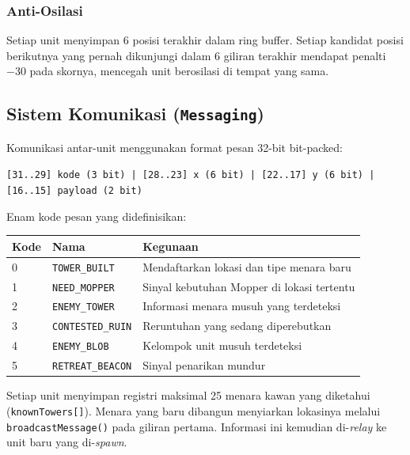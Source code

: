 \documentclass[12pt, a4paper]{article}
\begin{document}
\subsubsection*{Anti-Osilasi}

Setiap unit menyimpan 6 posisi terakhir dalam ring buffer. Setiap kandidat
posisi berikutnya yang pernah dikunjungi dalam 6 giliran terakhir mendapat penalti
$-30$ pada skornya, mencegah unit berosilasi di tempat yang sama.

\subsection{Sistem Komunikasi (\texttt{Messaging})}

Komunikasi antar-unit menggunakan format pesan 32-bit bit-packed:

\begin{center}
\texttt{[31..29] kode (3 bit) | [28..23] x (6 bit) | [22..17] y (6 bit) | [16..15] payload (2 bit)}
\end{center}

Enam kode pesan yang didefinisikan:

\begin{center}
\begin{tabular}{lll}
\toprule
\textbf{Kode} & \textbf{Nama} & \textbf{Kegunaan} \\
\midrule
0 & \texttt{TOWER\_BUILT}     & Mendaftarkan lokasi dan tipe menara baru \\
1 & \texttt{NEED\_MOPPER}     & Sinyal kebutuhan Mopper di lokasi tertentu \\
2 & \texttt{ENEMY\_TOWER}     & Informasi menara musuh yang terdeteksi \\
3 & \texttt{CONTESTED\_RUIN}  & Reruntuhan yang sedang diperebutkan \\
4 & \texttt{ENEMY\_BLOB}      & Kelompok unit musuh terdeteksi \\
5 & \texttt{RETREAT\_BEACON}  & Sinyal penarikan mundur \\
\bottomrule
\end{tabular}
\end{center}

Setiap unit menyimpan registri maksimal 25 menara kawan yang diketahui
(\texttt{knownTowers[]}). Menara yang baru dibangun menyiarkan lokasinya melalui
\texttt{broadcast\allowbreak Message()} pada giliran pertama. Informasi ini kemudian
di-\textit{relay} ke unit baru yang di-\textit{spawn}.

\end{document}
